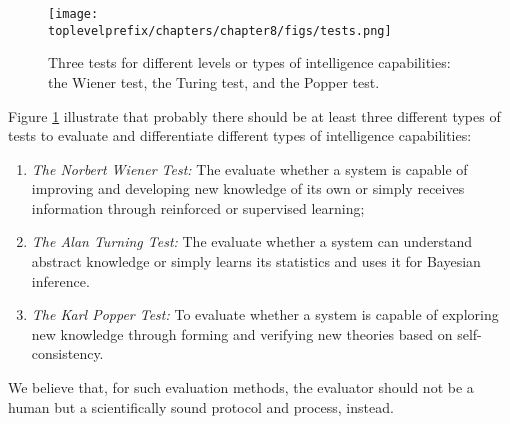 \documentclass[../../book-main.tex]{subfiles}
\begin{document}
\begin{figure}[t]
    \centering
    \texttt{[image: \\toplevelprefix/chapters/chapter8/figs/tests.png]}
    \caption{Three tests for different levels or types of intelligence capabilities: the Wiener test, the Turing test, and the Popper test.}
    \label{fig:three-tests}
\end{figure}

Figure \ref{fig:three-tests} illustrate that probably there should be at least three different types of tests to evaluate and differentiate different types of intelligence capabilities:
\begin{enumerate}
    \item {\em The Norbert Wiener Test:} The evaluate whether a system is capable of improving and developing new knowledge of its own or simply receives information through reinforced or supervised learning;
    \item {\em The Alan Turning Test:} The evaluate whether a system can understand abstract knowledge or simply learns its statistics and uses it for Bayesian inference.
    \item {\em The Karl Popper Test:} To evaluate whether a system is capable of exploring new knowledge through forming and verifying new theories based on self-consistency.
\end{enumerate}
We believe that, for such evaluation methods, the evaluator should not be a human but a scientifically sound protocol and process, instead.
\end{document}
